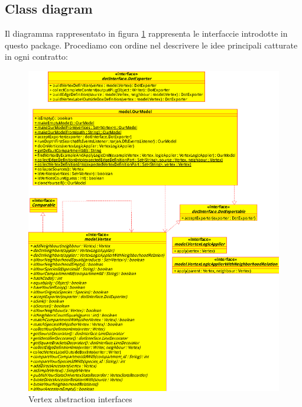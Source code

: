 \subsection{Class diagram}
Il diagramma rappresentato in figura
\ref{fig:vertex-abstraction-interfaces} rappresenta le interfaccie
introdotte in questo package. Procediamo con ordine nel descrivere le
idee principali catturate in ogni contratto:

\begin{figure}
  \centering
  \includegraphics{packages/vertex-interface-class-diagram.eps}
  \caption{Vertex abstraction interfaces}
  \label{fig:vertex-abstraction-interfaces}
\end{figure}

